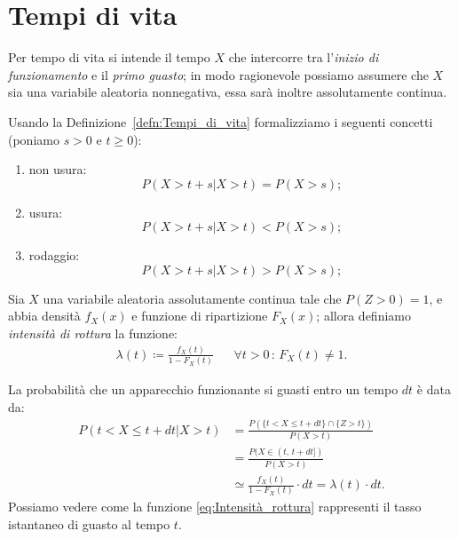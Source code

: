     \section{Tempi di vita}
    \begin{defn}\label{defn:Tempi_di_vita}
            Per tempo di vita si intende il tempo $X$ che intercorre tra l'\emph{inizio di funzionamento} e il \emph{primo guasto}; in modo ragionevole possiamo assumere che $X$ sia una variabile aleatoria non\nbdash negativa, essa sarà inoltre assolutamente continua.
        \end{defn}
        \begin{prty}\label{prty:Tempi_di_vita}
            Usando la Definizione~\ref{defn:Tempi_di_vita} formalizziamo i seguenti concetti (ponia\-mo $s > 0$ e $t \geq 0$):
            \begin{enumerate}
                \item non usura: \[\label{itm:Non_usura}
                        P(X > t + s | X > t)
                        = P(X > s)
                ;\] 
                \item usura: \[\label{itm:Usura}
                        P(X > t + s | X > t)
                        < P(X > s)
                ;\] 
                \item rodaggio: \[\label{itm:Rodaggio}
                        P(X > t + s | X > t)
                        > P(X > s)
                ;\] 
            \end{enumerate}
        \end{prty}
        \begin{defn}
            Sia $X$ una variabile aleatoria assolutamente continua tale che $P(Z > 0) = 1$, e abbia densità $f_X(x)$ e funzione di ripartizione $F_X(x)$; allora definiamo \emph{intensità di rottura} la funzione:
            \begin{align}\label{eq:Intensità_rottura}
                \lambda(t) \coloneqq \frac{f_X(t)}{1 - F_X(t)} & & \forall t>0 \,:\, F_X(t) \neq 1
            .\end{align}
        \end{defn}
        \begin{obsv}
            La probabilità che un apparecchio funzionante si guasti entro un tempo $dt$ è data da:
            \begin{align*}
                P(t < X \leq t + dt | X > t) &= \frac{P(\{t < X \leq t + dt\} \cap \{Z > t\})}{P(X > t)} \\
                                             &= \frac{P(X \in (t,\, t+dt])}{P(X > t)} \\
                                             &\simeq \frac{f_X(t)}{1 - F_X(t)} \cdot dt = \lambda(t)\cdot dt
            .\end{align*}
            Possiamo vedere come la funzione \eqref{eq:Intensità_rottura} rappresenti il tasso istantaneo di guasto al tempo $t$.
        \end{obsv}
